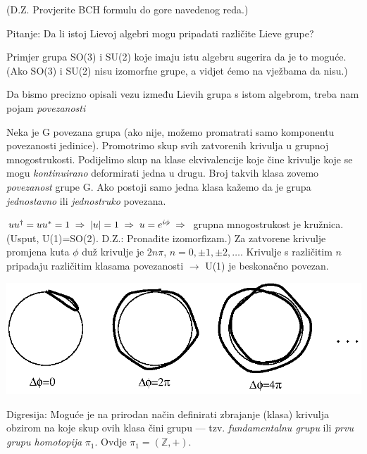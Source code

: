 (D.Z. Provjerite BCH formulu do gore navedenog reda.)

Pitanje: Da li istoj Lievoj algebri mogu pripadati različite Lieve grupe?

Primjer grupa SO(3) i SU(2) koje imaju istu algebru sugerira da je to moguće. 
(Ako SO(3) i SU(2) nisu izomorfne grupe, a vidjet ćemo na vježbama da nisu.)

Da bismo precizno opisali vezu između Lievih grupa s istom algebrom, treba
nam pojam \emph{povezanosti}

\begin{definicija}[Povezanost]
  Neka je G povezana grupa (ako nije, možemo promatrati samo komponentu
povezanosti jedinice). Promotrimo skup svih zatvorenih krivulja u grupnoj 
mnogostrukosti. Podijelimo skup  na klase ekvivalencije koje čine 
krivulje koje se mogu \emph{kontinuirano} deformirati jedna u drugu.
Broj takvih klasa zovemo \emph{povezanost} grupe G. Ako postoji samo
jedna klasa kažemo da je grupa \emph{jednostavno} ili \emph{jednostruko}
povezana.
\end{definicija}

\begin{primjer}[U(1)]
$u u^\dagger = u u^* = 1 \;\Rightarrow\; |u|=1 \;\Rightarrow\; u=e^{i\phi} \;\Rightarrow\;$ grupna
mnogostrukost je kružnica.
(Usput, U(1)=SO(2). D.Z.: Pronađite izomorfizam.)
Za zatvorene krivulje promjena kuta $\phi$ duž krivulje je $2n\pi$,
$n=0,\pm 1, \pm 2, \ldots$. Krivulje s različitim $n$ pripadaju
različitim klasama povezanosti $\to$ U(1) je beskonačno povezan.

\centerline{\includegraphics[scale=1.0]{pics/homotopija.eps}}

Digresija: Moguće je na prirodan način definirati zbrajanje (klasa) krivulja 
obzirom na koje skup ovih klasa čini grupu --- tzv. \emph{fundamentalnu
grupu} ili \emph{prvu grupu homotopija} $\pi_1$. Ovdje $\pi_1=(\mathbb{Z}, +)$.

\end{primjer}

